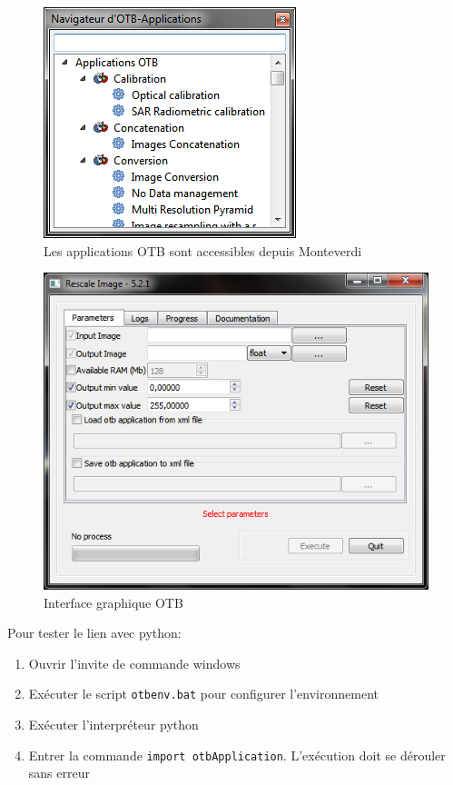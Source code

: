 \documentclass[10pt,a4paper]{article}
\begin{document}
\begin{figure}[h]
  \center
  \includegraphics[scale=1]{Art/windows-mapla.png}
  \caption[]{Les applications OTB sont accessibles depuis Monteverdi}
  \label{fig:windows-mapla}
\end{figure}

\begin{figure}[h]
  \center
  \includegraphics[scale=1]{Art/windows-otbgui.png}
  \caption[]{Interface graphique OTB}
  \label{fig:windows-otbgui}
\end{figure}

Pour tester le lien avec python:

\begin{enumerate}
 \item Ouvrir l'invite de commande windows
 \item Exécuter le script \verb?otbenv.bat? pour configurer l'environnement
 \item Exécuter l'interpréteur python
 \item Entrer la commande \verb?import otbApplication?. L'exécution doit se dérouler sans erreur
\end{enumerate}
\end{document}
